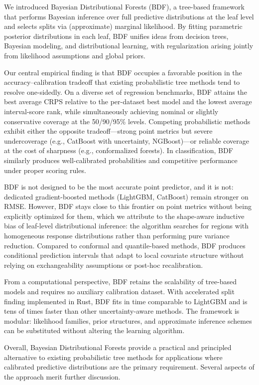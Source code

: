 \documentclass[twoside,11pt]{article}
\begin{document}
We introduced Bayesian Distributional Forests (BDF), a tree-based framework that performs Bayesian inference over full predictive distributions at the leaf level and selects splits via (approximate) marginal likelihood. By fitting parametric posterior distributions in each leaf, BDF unifies ideas from decision trees, Bayesian modeling, and distributional learning, with regularization arising jointly from likelihood assumptions and global priors.

Our central empirical finding is that BDF occupies a favorable position in the accuracy--calibration tradeoff that existing probabilistic tree methods tend to resolve one-sidedly. On a diverse set of regression benchmarks, BDF attains the best average CRPS relative to the per-dataset best model and the lowest average interval-score rank, while simultaneously achieving nominal or slightly conservative coverage at the 50/90/95\% levels. Competing probabilistic methods exhibit either the opposite tradeoff---strong point metrics but severe undercoverage (e.g., CatBoost with uncertainty, NGBoost)---or reliable coverage at the cost of sharpness (e.g., conformalized forests). In classification, BDF similarly produces well-calibrated probabilities and competitive performance under proper scoring rules.

BDF is not designed to be the most accurate point predictor, and it is not: dedicated gradient-boosted methods (LightGBM, CatBoost) remain stronger on RMSE. However, BDF stays close to this frontier on point metrics without being explicitly optimized for them, which we attribute to the shape-aware inductive bias of leaf-level distributional inference: the algorithm searches for regions with homogeneous response distributions rather than performing pure variance reduction. Compared to conformal and quantile-based methods, BDF produces conditional prediction intervals that adapt to local covariate structure without relying on exchangeability assumptions or post-hoc recalibration.

From a computational perspective, BDF retains the scalability of tree-based models and requires no auxiliary calibration dataset. With accelerated split finding implemented in Rust, BDF fits in time comparable to LightGBM and is tens of times faster than other uncertainty-aware methods. The framework is modular: likelihood families, prior structures, and approximate inference schemes can be substituted without altering the learning algorithm.

Overall, Bayesian Distributional Forests provide a practical and principled alternative to existing probabilistic tree methods for applications where calibrated predictive distributions are the primary requirement. Several aspects of the approach merit further discussion.
\end{document}
